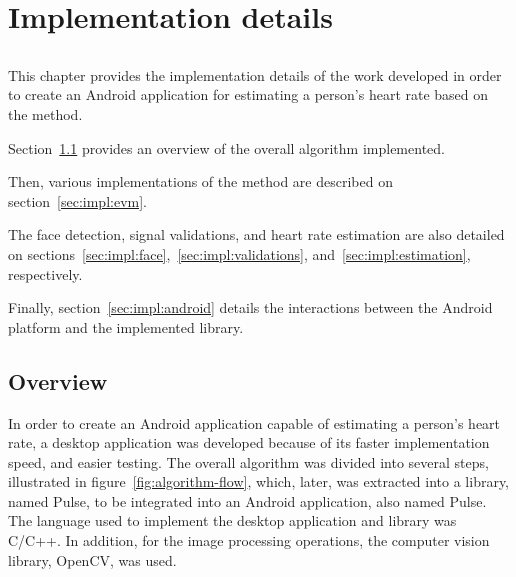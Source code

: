 \chapter{Implementation details} \label{chap:impl}

\section*{}


This chapter provides the implementation details of the work developed
in order to create an Android application for estimating a person's
heart rate based on the \evm{} method.

Section~\ref{sec:impl:overview} provides an overview of the overall algorithm
implemented.

Then, various implementations of the \evm{} method are described on
section~\ref{sec:impl:evm}.

The face detection, signal validations, and heart rate estimation are
also detailed on sections~\ref{sec:impl:face},~\ref{sec:impl:validations},
and~\ref{sec:impl:estimation}, respectively.

Finally, section~\ref{sec:impl:android} details the interactions between
the Android platform and the implemented library.

\section{Overview} \label{sec:impl:overview}


In order to create an Android application capable of estimating a person's
heart rate, a desktop application was developed because of
its faster implementation speed, and easier testing.
The overall algorithm was divided into several steps, illustrated in
figure~\ref{fig:algorithm-flow}, which, later, was extracted into a
library, named Pulse, to be integrated into an Android application,
also named Pulse.
The language used to implement the desktop application and library
was C/C++. In addition, for the image processing operations, the
computer vision library, OpenCV, was used.

